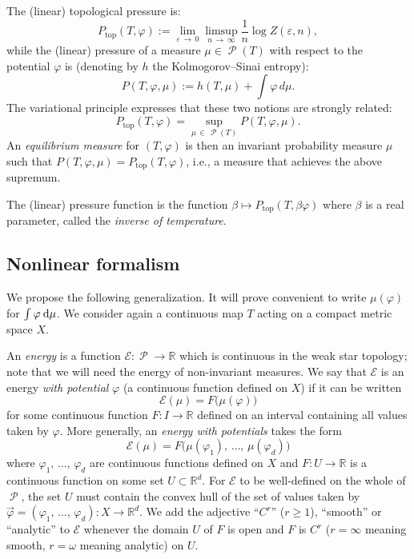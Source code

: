 \documentclass[AHL, Unicode, longabstracts,published]{cedram}
\theoremstyle{plain}
\theoremstyle{plain}
\newcommand\eps{\varepsilon}
\renewcommand\top{{\mathrm{top}}}
\newcommand\Prob{{\operatorname{\mathscr{P}}}}
\newcommand*{\dd} {\relax\ifnum\lastnodetype>0\mskip\medmuskip\fi\mathrm{d}}
\newcommand{\pot}{\varphi}
\newcommand*\be{\beta}
\newcommand*\8{\infty}
\newcommand\RR{\mathbb{R}}
\newcommand{\En}{\mathcal{E}}
\begin{document}
The (linear) topological pressure is:
\begin{equation}\label{eq-VP-classic}
P_\top(T,\pot):=
\lim_{\eps\,\to\,0} \limsup_{n\,\to\,\infty}\frac1n\log Z(\eps,n),
\end{equation}
while the (linear) pressure of a measure $\mu\in\Prob(T)$ with respect to the potential $\pot$ is (denoting by $h$ the Kolmogorov--Sinai entropy):
\[
P(T,\pot,\mu):= h(T,\mu) + \int\pot\,d\mu.
\]
The variational principle expresses that these two notions are strongly related:
\begin{equation}\label{eq-VP}
P_\top(T,\pot) = \sup_{\mu\,\in\,\Prob(T)} P(T,\pot,\mu).
\end{equation}
An \emph{equilibrium measure} for $(T,\pot)$ is then an invariant probability measure $\mu$ such that $P(T,\pot,\mu)=P_\top(T,\pot)$, i.e., a measure that achieves the above supremum.

The (linear) pressure function is the function $\be\mapsto P_{\top}(T,\beta\pot)$ where $\be$ is a real parameter, called the \emph{inverse of temperature}.



\subsection{Nonlinear formalism}
We propose the following generalization. It will prove convenient to write $\mu(\pot)$ for $\int\pot \dd\mu$. We consider again a continuous map $T$ acting on a compact metric space $X$.

An \emph{energy} is a function $\En : \Prob \to \RR$ which is continuous in the weak star topology; note that we will need the energy of non-invariant measures. We say that $\En$ is an energy \emph{with potential} $\pot$ (a continuous function defined on $X$) if it can be written
\[
\En(\mu) = F\big(\mu(\pot)\big)
\]
for some continuous function $F:I\to\RR$ defined on an interval containing all values taken by $\pot$. More generally, an \emph{energy with potentials} takes the form
\begin{equation}\label{eq-Energy}
\En(\mu) = F\big(\mu(\pot_1),\,\dots,\,\mu(\pot_d)\big)
\end{equation}
where $\pot_1,\,\dots,\,\pot_d$ are continuous functions defined on $X$ and $F:U\to\RR$ is a continuous function on some set $U\subset\RR^d$. For $\En$ to be well-defined on the whole of $\Prob$, the set $U$ must contain the convex hull of the set of values taken by $\vec\pot = (\pot_1,\,\dots,\,\pot_d):X\to\RR^d$. We add the adjective ``$C^r$'' ($r\ge 1$), ``smooth'' or ``analytic'' to $\En$ whenever the domain $U$ of $F$ is open and $F$ is $C^r$ ($r=\infty$ meaning smooth, $r=\omega$ meaning analytic) on $U$.
\end{document}
